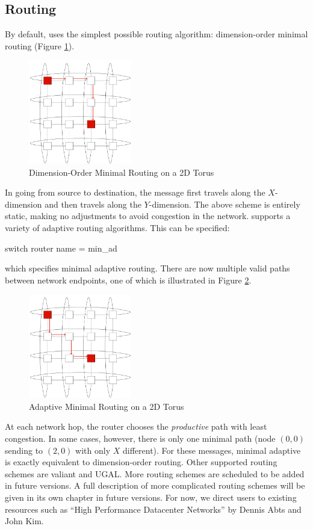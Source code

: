 \subsection{Routing}
\label{subsec:tutorial:routing}
By default, \sstmacro uses the simplest possible routing algorithm: dimension-order minimal routing (Figure \ref{fig:torus:basicrouting}).
\begin{figure}[h]
\centering
\includegraphics[width=0.4\textwidth]{figures/tikz/torus/minroutetorus.png}
\caption{Dimension-Order Minimal Routing on a 2D Torus}
\label{fig:torus:basicrouting}
\end{figure}
In going from source to destination, the message first travels along the $X$-dimension and then travels along the $Y$-dimension.
The above scheme is entirely static, making no adjustments to avoid congestion in the network.  
\sstmacro supports a variety of adaptive routing algorithms.  This can be specified:

\begin{ViFile}
switch {
 router {
  name = min_ad
 }
}
\end{ViFile}
which specifies minimal adaptive routing. 
There are now multiple valid paths between network endpoints, one of which is illustrated in Figure \ref{fig:torus:minadrouting}.
\begin{figure}[h!]
\centering
\includegraphics[width=0.4\textwidth]{figures/tikz/torus/minadroutetorus.png}
\caption{Adaptive Minimal Routing on a 2D Torus}
\label{fig:torus:minadrouting}
\end{figure}
At each network hop, the router chooses the \emph{productive} path with least congestion.  
In some cases, however, there is only one minimal path (node $(0,0)$ sending to $(2,0)$ with only $X$ different).
For these messages, minimal adaptive is exactly equivalent to dimension-order routing.  
Other supported routing schemes are valiant and UGAL.  More routing schemes are scheduled to be added in future versions.  
A full description of more complicated routing schemes will be given in its own chapter in future versions. 
For now, we direct users to existing resources such as ``High Performance Datacenter Networks'' by Dennis Abts and John Kim.
